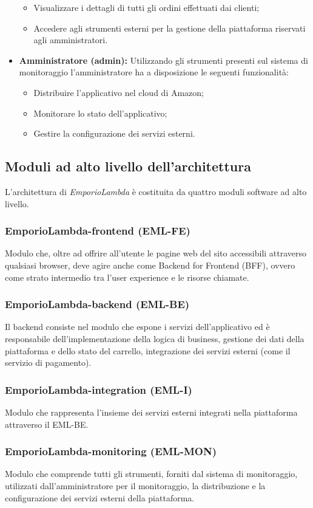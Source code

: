 \begin{itemize}
\begin{itemize}
	\item Visualizzare i dettagli di tutti gli ordini effettuati dai clienti;
	\item Accedere agli strumenti esterni per la gestione della piattaforma riservati agli amministratori.
	\end{itemize}
\item \textbf{Amministratore (admin):} Utilizzando gli strumenti presenti sul sistema di monitoraggio l'amministratore ha a disposizione le seguenti funzionalità:
	\begin{itemize}
	\item Distribuire l'applicativo nel cloud di Amazon;
	\item Monitorare lo stato dell'applicativo;
	\item Gestire la configurazione dei servizi esterni.
	\end{itemize}
\end{itemize}
\subsection{Moduli ad alto livello dell'architettura}
L'architettura di \textit{EmporioLambda} è costituita da quattro moduli software ad alto livello.
\subsubsection{EmporioLambda-frontend (EML-FE)}
Modulo che, oltre ad offrire all'utente le pagine web del sito accessibili attraverso qualsiasi browser, deve agire anche come Backend for Frontend (BFF), ovvero come strato intermedio tra l'user experience e le risorse chiamate.
\subsubsection{EmporioLambda-backend (EML-BE)}
Il backend consiste nel modulo che espone i servizi dell'applicativo ed è responsabile dell'implementazione della logica di business, gestione dei dati della piattaforma e dello stato del carrello, integrazione dei servizi esterni (come il servizio di pagamento).
\subsubsection{EmporioLambda-integration (EML-I)}
Modulo che rappresenta l'insieme dei servizi esterni integrati nella piattaforma attraverso il EML-BE.
\subsubsection{EmporioLambda-monitoring (EML-MON)}
Modulo che comprende tutti gli strumenti, forniti dal sistema di monitoraggio, utilizzati dall'amministratore per il monitoraggio, la distribuzione e la configurazione dei servizi esterni della piattaforma.
